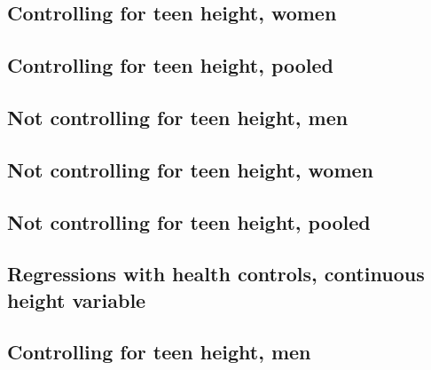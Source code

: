 \documentclass{article}
\begin{document}
\begin{landscape}
\subsection{Controlling for teen height, women}

\end{landscape}

\begin{landscape}
\subsection{Controlling for teen height, pooled}

\end{landscape}

\begin{landscape}
\subsection{Not controlling for teen height, men}

\end{landscape}

\begin{landscape}
\subsection{Not controlling for teen height, women}

\end{landscape}

\begin{landscape}
\subsection{Not controlling for teen height, pooled}

\end{landscape}


\begin{landscape}
\section{Regressions with health controls, continuous height variable}
\subsection{Controlling for teen height, men}

\end{landscape}
\end{document}
